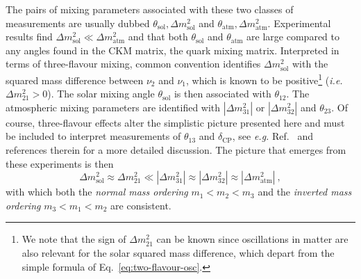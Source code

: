   The pairs of mixing parameters associated with these two classes of
  measurements are usually dubbed
  $\theta_{\text{sol}}, \Delta m^{2}_{\text{sol}}$ and
  $\theta_{\text{atm}}, \Delta m^{2}_{\text{atm}}$. Experimental results find
  $\Delta m^{2}_{\text{sol}} \ll \Delta m^{2}_{\text{atm}}$ and that both
  $\theta_{\text{sol}}$ and $\theta_{\text{atm}}$ are large compared to any
  angles found in the CKM matrix, the quark mixing matrix. Interpreted in terms
  of three-flavour mixing, common convention identifies
  $\Delta m_{\text{sol}}^{2}$ with the squared mass difference between $\nu_{2}$
  and $\nu_{1}$, which is known to be positive\footnote{We note that the sign of
    $\Delta m_{21}^{2}$ can be known since oscillations in matter are also
    relevant for the solar squared mass difference, which depart from the simple
    formula of Eq.~\eqref{eq:two-flavour-osc}.} (\textit{i.e.}
  $\Delta m^{2}_{21} > 0$). The solar mixing angle $\theta_{\text{sol}}$ is then
  associated with $\theta_{12}$. The atmospheric mixing parameters are
  identified with $|\Delta m_{31}^{2}|$ or $|\Delta m_{32}^{2}|$ and
  $\theta_{23}$. Of course, three-flavour effects alter the simplistic picture
  presented here and must be included to interpret measurements of $\theta_{13}$
  and $\delta_{\text{CP}}$, see \textit{e.g.} Ref.~\cite{Giganti:2017fhf} and
  references therein for a more detailed discussion. The picture that emerges
  from these experiments is then
  \begin{equation}
    \Delta m^{2}_{\text{sol}} \approx \Delta m^{2}_{21} \ll |\Delta m_{31}^{2}| \approx |\Delta m_{32}^{2}| \approx |\Delta m_{\text{atm}}^{2}| \ ,
  \end{equation}
  with which both the \textit{normal mass ordering} $m_{1} < m_{2} < m_{3}$ and
  the \textit{inverted mass ordering} $m_{3} < m_{1} < m_{2}$ are consistent.

